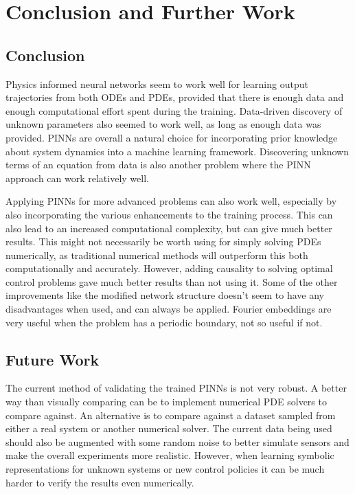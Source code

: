 \chapter{Conclusion and Further Work}\label{cpt:conclusions}

\section{Conclusion}

Physics informed neural networks seem to work well for learning output trajectories from both ODEs and PDEs, provided that there is enough data and enough computational effort spent during the training. Data-driven discovery of unknown parameters also seemed to work well, as long as enough data was provided. PINNs are overall a natural choice for incorporating prior knowledge about system dynamics into a machine learning framework. Discovering unknown terms of an equation from data is also another problem where the PINN approach can work relatively well.

Applying PINNs for more advanced problems can also work well, especially by also incorporating the various enhancements to the training process. This can also lead to an increased computational complexity, but can give much better results. This might not necessarily be worth using for simply solving PDEs numerically, as traditional numerical methods will outperform this both computationally and accurately. However, adding causality to solving optimal control problems gave much better results than not using it. Some of the other improvements like the modified network structure doesn't seem to have any disadvantages when used, and can always be applied. Fourier embeddings are very useful when the problem has a periodic boundary, not so useful if not. 


\section{Future Work}

The current method of validating the trained PINNs is not very robust. A better way than visually comparing can be to implement numerical PDE solvers to compare against. An alternative is to compare against a dataset sampled from either a real system or another numerical solver. The current data being used should also be augmented with some random noise to better simulate sensors and make the overall experiments more realistic. However, when learning symbolic representations for unknown systems or new control policies it can be much harder to verify the results even numerically.

